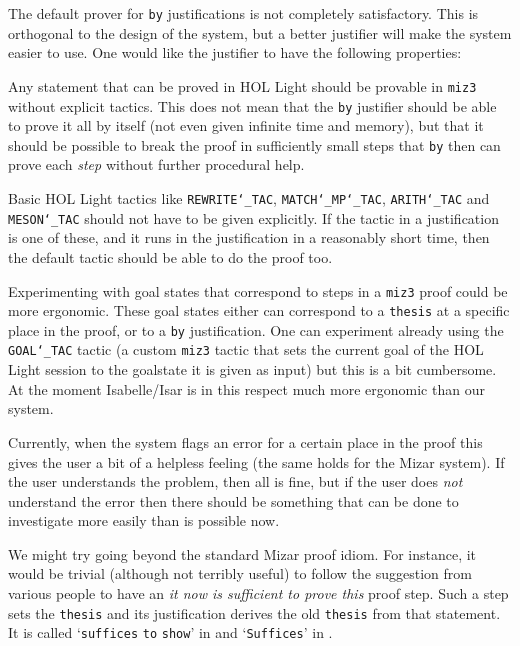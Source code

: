 \documentclass{LMCS}
\begin{document}
\begin{iteMize}{}
\item
The default prover for \texttt{by} justifications
is not completely satisfactory.
This is orthogonal to the design of the system, but a better
justifier will make the system easier to use.
One would like the justifier to have the following properties:

\begin{iteMize}{}
\item
Any statement that can be proved in HOL Light should be provable in
\texttt{miz3} without explicit tactics.
This does not mean that the \texttt{by} justifier should be able to prove
it all by itself (not even given infinite time and memory), but that it should be possible
to break the proof in sufficiently small steps that \texttt{by}
then can prove each \emph{step} without further procedural help.

\item
Basic HOL Light tactics like \texttt{REWRITE\char`\_TAC}, \texttt{MATCH\char`\_MP\char`\_TAC},
\texttt{ARITH\char`\_{}TAC} and \texttt{MESON\char`\_TAC} should not have to be given
explicitly.
If the tactic in a justification is one of these, and it runs
in the justification in a reasonably short time, then the
default tactic should be able to do the proof too.

\end{iteMize}

\item
Experimenting with goal states that correspond to steps in a \texttt{miz3}
proof could be more ergonomic.
These goal states either can correspond to a \texttt{thesis} at a specific
place in the proof, or to a \texttt{by} justification.
One can experiment already using the \texttt{GOAL\char`\_TAC} tactic (a
custom \texttt{miz3} tactic that
sets the current goal of the HOL Light session to the goalstate it is given as input) but this is
a bit cumbersome.
At the moment Isabelle/Isar is in this respect much more ergonomic than our system.

Currently, when the system flags an error for a certain place in the
proof this gives the user a bit of a helpless feeling
(the same holds for the Mizar system).
If the user understands the problem, then all is fine,
but if the user does \emph{not} understand the error then there should
be something that can be done to investigate more easily than is
possible now.

\item
We might try going beyond the
standard Mizar proof idiom.
For instance, it would be trivial (although not terribly useful) to follow the suggestion from various people to
have an \emph{it now is sufficient to prove this}
proof step.
Such a step sets the \texttt{thesis} and its justification derives the old
\texttt{thesis} from that statement.
It is called `\texttt{suffices} \texttt{to} \texttt{show}' in \cite{har:96} and `\texttt{Suffices}' in \cite{bar:03}.


\end{iteMize}
\end{document}
